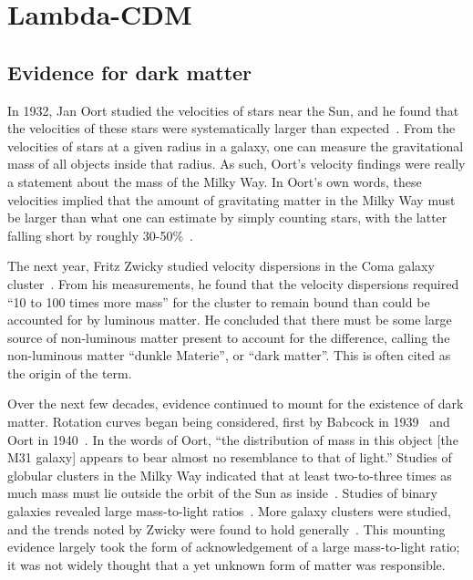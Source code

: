 \hypertarget{lambda-cdm}{%
\chapter{Lambda-CDM}\label{lambda-cdm}}

\hypertarget{evidence-for-dark-matter}{%
\section{Evidence for dark matter}\label{evidence-for-dark-matter}}

In 1932, Jan Oort studied the velocities of stars near the Sun, and he found
that the velocities of these stars were systematically larger than
expected~\cite{oort_force_1932}. From the velocities of stars at a given
radius in a galaxy, one can measure the gravitational mass of all objects
inside that radius. As such, Oort's velocity findings were really a statement
about the mass of the Milky Way. In Oort's own words, these velocities implied
that the amount of gravitating matter in the Milky Way must be larger than
what one can estimate by simply counting stars, with the latter falling short
by roughly 30-50\%~\cite{trimble_existence_1987}.

The next year, Fritz Zwicky studied velocity dispersions in the Coma galaxy
cluster~\cite{zwicky_rotverschiebung_1933,andernach_english_2017}. From his
measurements, he found that the velocity dispersions required ``10 to 100
times more mass'' for the cluster to remain bound than could be accounted for
by luminous matter. He concluded that there must be some large source of
non-luminous matter present to account for the difference, calling the
non-luminous matter ``dunkle Materie'', or ``dark matter''. This is often
cited as the origin of the term.

Over the next few decades, evidence continued to mount for the existence of
dark matter. Rotation curves began being considered, first by Babcock in
1939~\cite{babcock_rotation_1939} and Oort in 1940~\cite{oort_problems_1940}.
In the words of Oort, ``the distribution of mass in this object [the M31
galaxy] appears to bear almost no resemblance to that of light.'' Studies of
globular clusters in the Milky Way indicated that at least two-to-three times
as much mass must lie outside the orbit of the Sun as
inside~\cite{lohmann_masse_1956}.  Studies of binary galaxies revealed large
mass-to-light ratios~\cite{page_average_1960,holmberg_masses_1954}.  More
galaxy clusters were studied, and the trends noted by Zwicky were found to
hold generally~\cite{trimble_history_2013}.  This mounting evidence largely
took the form of acknowledgement of a large mass-to-light ratio; it was not
widely thought that a yet unknown form of matter was responsible.

